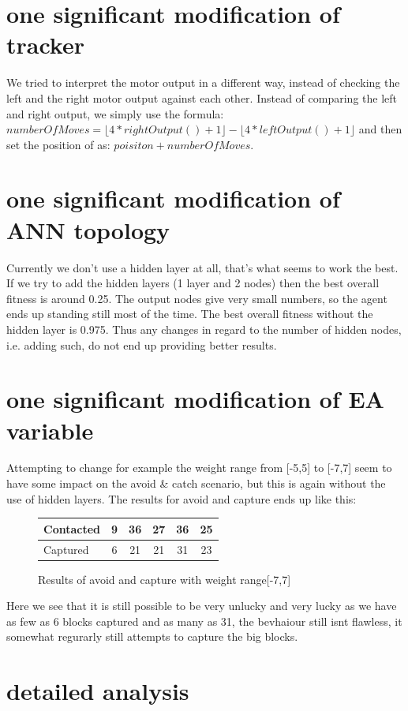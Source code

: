 \documentclass[12pt, a4paper]{article}
\begin{document}
\section{one significant modification of tracker}
We tried to interpret the motor output in a different way, instead of checking the left and the right motor output against each other. Instead of comparing the left and right output, we simply use the formula:\\ $numberOfMoves = \lfloor 4*rightOutput()+1 \rfloor - \lfloor 4*leftOutput()+1 \rfloor$
and then set the position of as: $ poisiton + numberOfMoves $.

\section{one significant modification of ANN topology}
Currently we don't use a hidden layer at all, that's what seems to work the best. If we try to add the hidden layers (1 layer and 2 nodes) then the best overall fitness is around 0.25. The output nodes give very small numbers, so the agent ends up standing still most of the time. The best overall fitness without the hidden layer is 0.975. Thus any changes in regard to the number of hidden nodes, i.e. adding such, do not end up providing better results.

\section{one significant modification of EA variable}
Attempting to change for example the weight range from [-5,5] to [-7,7] seem to have some impact on the avoid \& catch scenario, but this is again without the use of hidden layers. The results for avoid and capture ends up like this:

\begin{figure}[H]
	\begin{center}
		\begin{tabular}{l | c | c |c |c |c }
		 Contacted& 9 & 36 & 27 & 36 & 25\\ \hline
		 Captured & 6 & 21 & 21 & 31 & 23\\
		 
		\end{tabular}
	\end{center}
	\caption{Results of avoid and capture with weight range[-7,7]}
\end{figure}

Here we see that it is still possible to be very unlucky and very lucky as we have as few as 6 blocks captured and as many as 31, the bevhaiour still isnt flawless, it somewhat regurarly still attempts to capture the big blocks. 

\section{detailed analysis}
\end{document}
